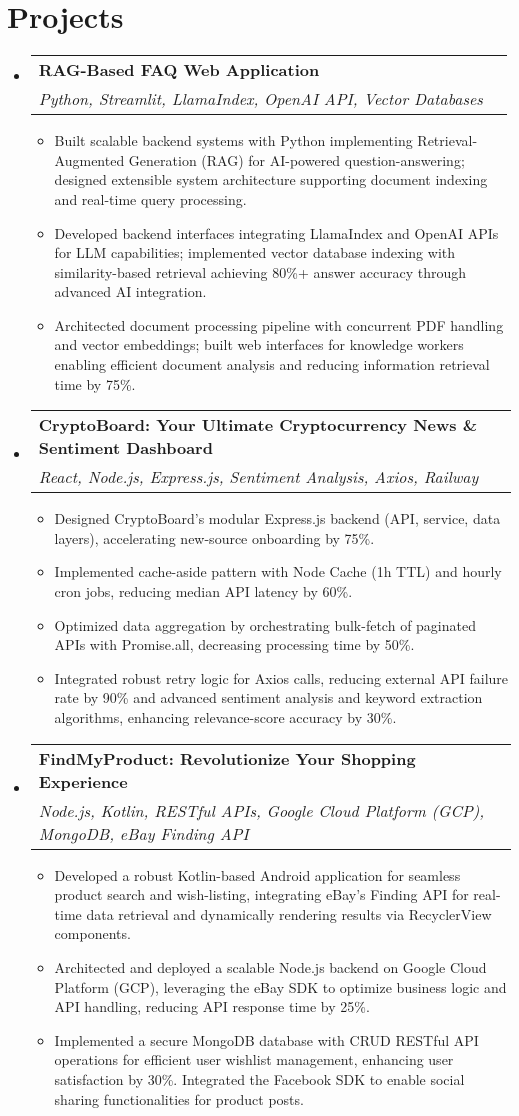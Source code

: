 \documentclass[letterpaper,10pt]{article}
\makeatletter
\newcommand{\resumeItem}[1]{
  \item\small{
    {#1 \vspace{-2pt}}
  }
}
\newcommand{\resumeSubheading}[4]{
  \vspace{-2pt}\item
    \begin{tabular*}{1.0\textwidth}[t]{l@{\extracolsep{\fill}}r}
      \textbf{#1} & \textbf{\small #2} \\
      \textit{\small#3} & \textit{\small #4} \\
    \end{tabular*}\vspace{-7pt}
}
\newcommand{\resumeSubHeadingListStart}{\begin{itemize}[leftmargin=0.15in, label={}]}
\newcommand{\resumeSubHeadingListEnd}{\end{itemize}}
\newcommand{\resumeItemListStart}{\begin{itemize}[leftmargin=*, itemsep=-1pt]}
\newcommand{\resumeItemListEnd}{\end{itemize}\vspace{-5pt}}
\makeatother
\begin{document}
\section{Projects}
\resumeSubHeadingListStart
  \resumeSubheading
    {RAG-Based FAQ Web Application}{}
    {Python, Streamlit, LlamaIndex, OpenAI API, Vector Databases}{}
    \resumeItemListStart
      \resumeItem{Built scalable backend systems with Python implementing Retrieval-Augmented Generation (RAG) for AI-powered question-answering; designed extensible system architecture supporting document indexing and real-time query processing.}
      \resumeItem{Developed backend interfaces integrating LlamaIndex and OpenAI APIs for LLM capabilities; implemented vector database indexing with similarity-based retrieval achieving 80\%+ answer accuracy through advanced AI integration.}
      \resumeItem{Architected document processing pipeline with concurrent PDF handling and vector embeddings; built web interfaces for knowledge workers enabling efficient document analysis and reducing information retrieval time by 75\%.}
    \resumeItemListEnd
\vspace{-5pt}
  \resumeSubheading
    {CryptoBoard: Your Ultimate Cryptocurrency News \& Sentiment Dashboard}{}
    {React, Node.js, Express.js, Sentiment Analysis, Axios, Railway}{}
    \resumeItemListStart
      \resumeItem{Designed CryptoBoard's modular Express.js backend (API, service, data layers), accelerating new-source onboarding by 75\%.}
      \resumeItem{Implemented cache-aside pattern with Node Cache (1h TTL) and hourly cron jobs, reducing median API latency by 60\%.}
      \resumeItem{Optimized data aggregation by orchestrating bulk-fetch of paginated APIs with Promise.all, decreasing processing time by 50\%.}
      \resumeItem{Integrated robust retry logic for Axios calls, reducing external API failure rate by 90\% and advanced sentiment analysis and keyword extraction algorithms, enhancing relevance-score accuracy by 30\%.}
    \resumeItemListEnd
\vspace{-5pt}
  \resumeSubheading
    {FindMyProduct: Revolutionize Your Shopping Experience}{}
    {Node.js, Kotlin, RESTful APIs, Google Cloud Platform (GCP), MongoDB, eBay Finding API}{}
    \resumeItemListStart
      \resumeItem{Developed a robust Kotlin-based Android application for seamless product search and wish-listing, integrating eBay's Finding API for real-time data retrieval and dynamically rendering results via RecyclerView components.}
      \resumeItem{Architected and deployed a scalable Node.js backend on Google Cloud Platform (GCP), leveraging the eBay SDK to optimize business logic and API handling, reducing API response time by 25\%.}
      \resumeItem{Implemented a secure MongoDB database with CRUD RESTful API operations for efficient user wishlist management, enhancing user satisfaction by 30\%. Integrated the Facebook SDK to enable social sharing functionalities for product posts.}
    \resumeItemListEnd
\resumeSubHeadingListEnd
\end{document}
